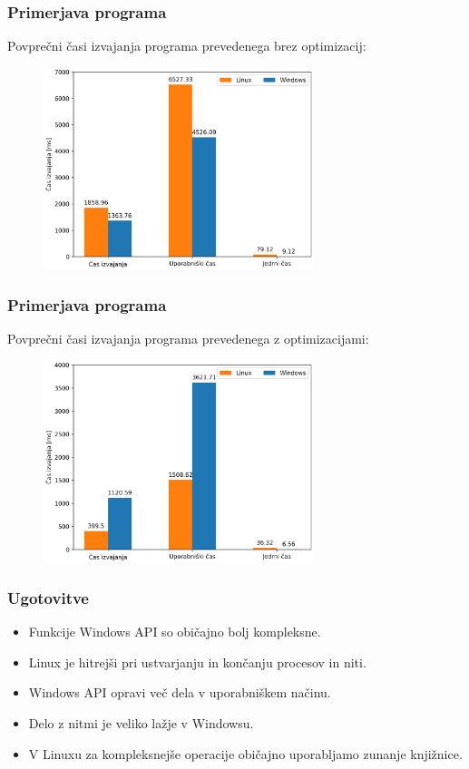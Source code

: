 \documentclass{beamer}
\begin{document}
\begin{frame}
	\frametitle{Primerjava programa}
	Povprečni časi izvajanja programa prevedenega brez optimizacij:
	\begin{figure}
		\begin{center}
			\includegraphics[width=0.7\textwidth]{images/program_comparison.png}
		\end{center}
	\end{figure}
\end{frame}

\begin{frame}
	\frametitle{Primerjava programa}
	Povprečni časi izvajanja programa prevedenega z optimizacijami:
	\begin{figure}
		\begin{center}
			\includegraphics[width=0.7\textwidth]{images/program_comparison_optimized.png}
		\end{center}
	\end{figure}
\end{frame}

\begin{frame}
	\frametitle{Ugotovitve}
	\begin{itemize}
		\item Funkcije Windows API so običajno bolj kompleksne.
		\item Linux je hitrejši pri ustvarjanju in končanju procesov in niti.
		\item Windows API opravi več dela v uporabniškem načinu.
		\item Delo z nitmi je veliko lažje v Windowsu.
		\item V Linuxu za kompleksnejše operacije običajno uporabljamo zunanje knjižnice.
	\end{itemize}
\end{frame}
\end{document}
